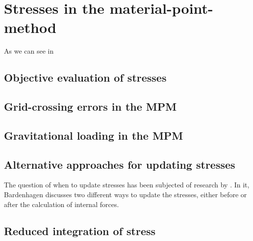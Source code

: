 
\section{Stresses in the material-point-method}
\label{sec:stress-mater-point}

As we can see in \cite{Andersen2010}

\subsection{Objective evaluation of stresses}
\label{sec:object-eval-stress}


\subsection{Grid-crossing errors in the MPM}
\label{sec:grid-crossing-errors}

\subsection{Gravitational loading in the MPM}
\label{sec:grav-load-mpm}


\subsection{Alternative approaches for updating stresses}
\label{sec:altern-appr-updat}

The question of when to update stresses has been subjected of research
by \cite{Bardenhagen2002}. In it, Bardenhagen discusses two different
ways to update the stresses, either before or after the calculation of
internal forces. 


\subsection{Reduced integration of stress}
\label{sec:reduc-integr-stress}



